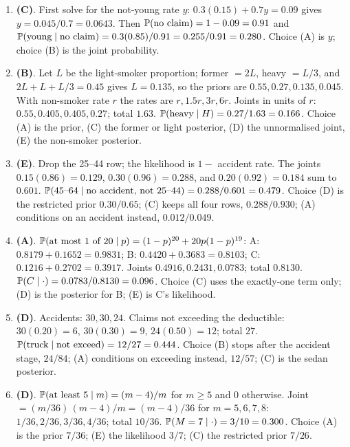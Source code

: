 \begin{enumerate}[nosep,leftmargin=2em]
  \item \textbf{(C)}. First solve for the not-young rate $y$: $0.3(0.15) + 0.7y = 0.09$ gives
        $y = 0.045/0.7 = 0.0643$. Then $\mathbb{P}(\text{no claim}) = 1 - 0.09 = 0.91$ and
        $\mathbb{P}(\text{young} \mid \text{no claim}) = 0.3(0.85)/0.91 = 0.255/0.91 = 0.280$.
        Choice (A) is $y$; choice (B) is the joint probability.
  \item \textbf{(B)}. Let $L$ be the light-smoker proportion; former $= 2L$, heavy $= L/3$, and
        $2L + L + L/3 = 0.45$ gives $L = 0.135$, so the priors are $0.55, 0.27, 0.135, 0.045$.
        With non-smoker rate $r$ the rates are $r, 1.5r, 3r, 6r$. Joints in units of $r$:
        $0.55, 0.405, 0.405, 0.27$; total $1.63$. $\mathbb{P}(\text{heavy} \mid H) = 0.27/1.63 = 0.166$.
        Choice (A) is the prior, (C) the former or light posterior, (D) the unnormalised joint,
        (E) the non-smoker posterior.
  \item \textbf{(E)}. Drop the 25--44 row; the likelihood is $1 -$ accident rate. The joints
        $0.15(0.86) = 0.129$, $0.30(0.96) = 0.288$, and $0.20(0.92) = 0.184$ sum to $0.601$.
        $\mathbb{P}(45\text{--}64 \mid \text{no accident, not 25--44}) = 0.288/0.601 = 0.479$.
        Choice (D) is the restricted prior $0.30/0.65$; (C) keeps all four rows, $0.288/0.930$;
        (A) conditions on an accident instead, $0.012/0.049$.
  \item \textbf{(A)}. $\mathbb{P}(\text{at most 1 of 20} \mid p) = (1-p)^{20} + 20p(1-p)^{19}$:
        A: $0.8179 + 0.1652 = 0.9831$; B: $0.4420 + 0.3683 = 0.8103$; C: $0.1216 + 0.2702 = 0.3917$.
        Joints $0.4916, 0.2431, 0.0783$; total $0.8130$. $\mathbb{P}(C \mid \cdot) = 0.0783/0.8130 = 0.096$.
        Choice (C) uses the exactly-one term only; (D) is the posterior for B; (E) is C's likelihood.
  \item \textbf{(D)}. Accidents: $30, 30, 24$. Claims not exceeding the deductible:
        $30(0.20) = 6$, $30(0.30) = 9$, $24(0.50) = 12$; total $27$.
        $\mathbb{P}(\text{truck} \mid \text{not exceed}) = 12/27 = 0.444$. Choice (B) stops after
        the accident stage, $24/84$; (A) conditions on exceeding instead, $12/57$; (C) is the
        sedan posterior.
  \item \textbf{(D)}. $\mathbb{P}(\text{at least 5} \mid m) = (m - 4)/m$ for $m \geq 5$ and $0$
        otherwise. Joint $= (m/36)\,(m-4)/m = (m-4)/36$ for $m = 5, 6, 7, 8$: $1/36, 2/36, 3/36, 4/36$;
        total $10/36$. $\mathbb{P}(M = 7 \mid \cdot) = 3/10 = 0.300$. Choice (A) is the prior $7/36$;
        (E) the likelihood $3/7$; (C) the restricted prior $7/26$.

\end{enumerate}
